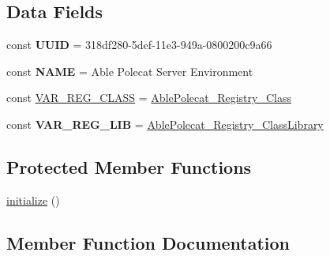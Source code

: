 \subsection*{Data Fields}
\begin{DoxyCompactItemize}
\item 
\hypertarget{class_able_polecat___environment___server_a74b892c8c0b86bf9d04c5819898c51e7}{}const {\bfseries U\+U\+I\+D} = \textquotesingle{}318df280-\/5def-\/11e3-\/949a-\/0800200c9a66\textquotesingle{}\label{class_able_polecat___environment___server_a74b892c8c0b86bf9d04c5819898c51e7}

\item 
\hypertarget{class_able_polecat___environment___server_a244352f035b82b20b0efa506167fd862}{}const {\bfseries N\+A\+M\+E} = \textquotesingle{}Able Polecat Server Environment\textquotesingle{}\label{class_able_polecat___environment___server_a244352f035b82b20b0efa506167fd862}

\item 
const \hyperlink{class_able_polecat___environment___server_acb8e57de3e85989a3b4d1fe439cedf3d}{V\+A\+R\+\_\+\+R\+E\+G\+\_\+\+C\+L\+A\+S\+S} = \textquotesingle{}\hyperlink{class_able_polecat___registry___class}{Able\+Polecat\+\_\+\+Registry\+\_\+\+Class}\textquotesingle{}
\item 
\hypertarget{class_able_polecat___environment___server_a5af159b68f1728d92e7cd14e0dac397f}{}const {\bfseries V\+A\+R\+\_\+\+R\+E\+G\+\_\+\+L\+I\+B} = \textquotesingle{}\hyperlink{class_able_polecat___registry___class_library}{Able\+Polecat\+\_\+\+Registry\+\_\+\+Class\+Library}\textquotesingle{}\label{class_able_polecat___environment___server_a5af159b68f1728d92e7cd14e0dac397f}

\end{DoxyCompactItemize}
\subsection*{Protected Member Functions}
\begin{DoxyCompactItemize}
\item 
\hyperlink{class_able_polecat___environment___server_a91098fa7d1917ce4833f284bbef12627}{initialize} ()
\end{DoxyCompactItemize}


\subsection{Member Function Documentation}
\hypertarget{class_able_polecat___environment___server_acfaa3a96d0cb5a4c0d4d710dcba41e9e}{}
